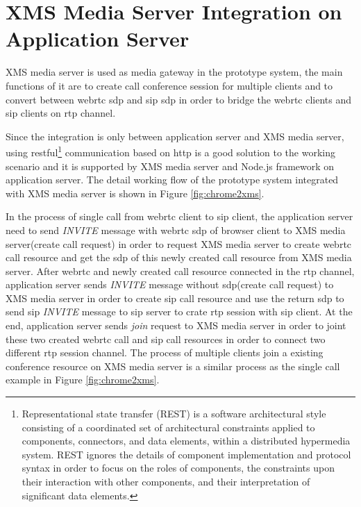 \section{XMS Media Server Integration on Application Server}

\noindent XMS media server is used as media gateway in the prototype system, the main functions of it are to create call conference session for multiple clients and to convert between \gls{webrtc} \gls{sdp} and \gls{sip} \gls{sdp} in order to bridge the \gls{webrtc} clients and \gls{sip} clients on \gls{rtp} channel.

\par Since the integration is only between application server and XMS media server, using \gls{rest}ful\footnote{Representational state transfer (REST) is a software architectural style consisting of a coordinated set of architectural constraints applied to components, connectors, and data elements, within a distributed hypermedia system. REST ignores the details of component implementation and protocol syntax in order to focus on the roles of components, the constraints upon their interaction with other components, and their interpretation of significant data elements.\cite{wiki:restful}} communication based on \gls{http} is a good solution to the working scenario and it is supported by XMS media server and Node.js framework on application server. The detail working flow of the prototype system integrated with XMS media server is shown in Figure \ref{fig:chrome2xms}.

\par In the process of single call from \gls{webrtc} client to \gls{sip} client, the application server need to send \textit{INVITE} message with \gls{webrtc} \gls{sdp} of browser client to XMS media server(create call request) in order to request XMS media server to create \gls{webrtc} call resource and get the \gls{sdp} of this newly created call resource from XMS media server. After \gls{webrtc} and newly created call resource connected in the \gls{rtp} channel, application server sends \textit{INVITE} message without \gls{sdp}(create call request) to XMS media server in order to create \gls{sip} call resource and use the return \gls{sdp} to send \gls{sip} \textit{INVITE} message to \gls{sip} server to crate \gls{rtp} session with \gls{sip} client. At the end, application server sends \textit{join} request to XMS media server in order to joint these two created \gls{webrtc} call and \gls{sip} call resources in order to connect two different \gls{rtp} session channel. The process of multiple clients join a existing conference resource on XMS media server is a similar process as the single call example in Figure \ref{fig:chrome2xms}.

